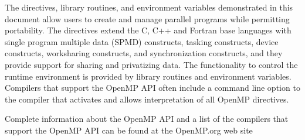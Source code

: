 The directives, library routines, and environment variables demonstrated in this
document allow users to create and manage parallel programs while permitting
portability. The directives extend the C, C++ and Fortran base languages with single
program multiple data (SPMD) constructs, tasking constructs, device constructs,
worksharing constructs, and synchronization constructs, and they provide support for
sharing and privatizing data. The functionality to control the runtime environment is
provided by library routines and environment variables. Compilers that support the
OpenMP API often include a command line option to the compiler that activates and
allows interpretation of all OpenMP directives.

Complete information about the OpenMP API and a list of the compilers that support
the OpenMP API can be found at the OpenMP.org web site




